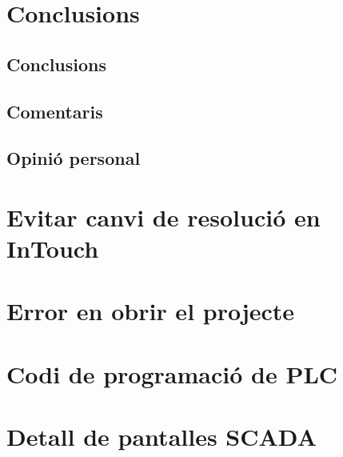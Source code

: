 \chapter{Conclusions}


\section{Conclusions}


\section{Comentaris}


\section{Opinió personal}



\appendix


\chapter{Evitar canvi de resolució en InTouch}


\chapter{Error en obrir el projecte}



\chapter{Codi de programació de PLC}


\chapter{Detall de pantalles SCADA}




\nocite{*}





